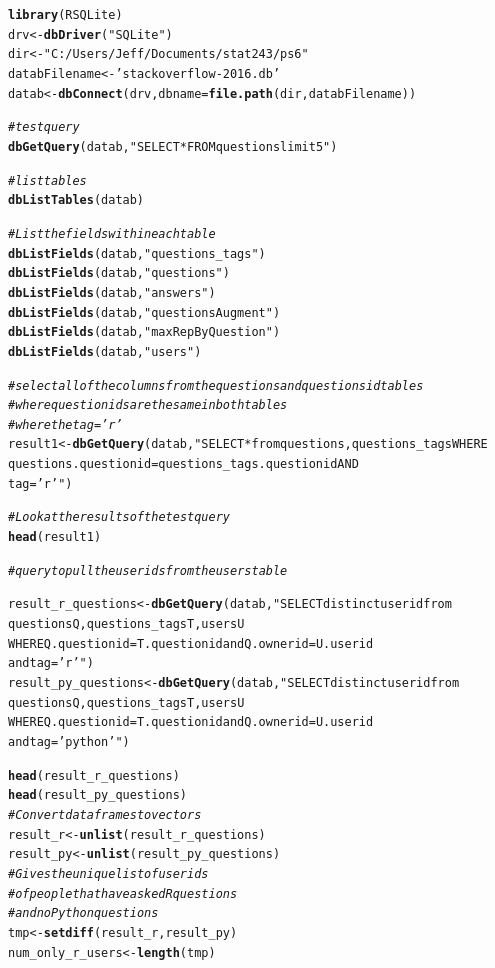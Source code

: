 \documentclass{article}\usepackage[]{graphicx}\usepackage[]{color}
\makeatletter
\newcommand{\hlstr}[1]{\textcolor[rgb]{0.192,0.494,0.8}{#1}}%
\newcommand{\hlcom}[1]{\textcolor[rgb]{0.678,0.584,0.686}{\textit{#1}}}%
\newcommand{\hlstd}[1]{\textcolor[rgb]{0.345,0.345,0.345}{#1}}%
\newcommand{\hlkwb}[1]{\textcolor[rgb]{0.69,0.353,0.396}{#1}}%
\newcommand{\hlkwc}[1]{\textcolor[rgb]{0.333,0.667,0.333}{#1}}%
\newcommand{\hlkwd}[1]{\textcolor[rgb]{0.737,0.353,0.396}{\textbf{#1}}}%
\newenvironment{kframe}{%
 \def\at@end@of@kframe{}%
 \ifinner\ifhmode%
  \def\at@end@of@kframe{\end{minipage}}%
  \begin{minipage}{\columnwidth}%
 \fi\fi%
 \def\FrameCommand##1{\hskip\@totalleftmargin \hskip-\fboxsep
 \colorbox{shadecolor}{##1}\hskip-\fboxsep
     \hskip-\linewidth \hskip-\@totalleftmargin \hskip\columnwidth}%
 \MakeFramed {\advance\hsize-\width
   \@totalleftmargin\z@ \linewidth\hsize
   \@setminipage}}%
 {\par\unskip\endMakeFramed%
 \at@end@of@kframe}
\newenvironment{knitrout}{}{} %
\makeatother
\begin{document}
\begin{knitrout}
\color{fgcolor}\begin{kframe}
\begin{alltt}
\hlkwd{library}\hlstd{(RSQLite)}
\hlstd{drv} \hlkwb{<-} \hlkwd{dbDriver}\hlstd{(}\hlstr{"SQLite"}\hlstd{)}
\hlstd{dir} \hlkwb{<-} \hlstr{"C:/Users/Jeff/Documents/stat243/ps6"}
\hlstd{databFilename} \hlkwb{<-} \hlstr{'stackoverflow-2016.db'}
\hlstd{datab} \hlkwb{<-} \hlkwd{dbConnect}\hlstd{(drv,} \hlkwc{dbname} \hlstd{=} \hlkwd{file.path}\hlstd{(dir, databFilename))}

\hlcom{# test query}
\hlkwd{dbGetQuery}\hlstd{(datab,} \hlstr{"SELECT * FROM questions limit 5"}\hlstd{)}

\hlcom{# list tables}
\hlkwd{dbListTables}\hlstd{(datab)}

\hlcom{# List the fields within each table}
\hlkwd{dbListFields}\hlstd{(datab,} \hlstr{"questions_tags"}\hlstd{)}
\hlkwd{dbListFields}\hlstd{(datab,} \hlstr{"questions"}\hlstd{)}
\hlkwd{dbListFields}\hlstd{(datab,} \hlstr{"answers"}\hlstd{)}
\hlkwd{dbListFields}\hlstd{(datab,} \hlstr{"questionsAugment"}\hlstd{)}
\hlkwd{dbListFields}\hlstd{(datab,} \hlstr{"maxRepByQuestion"}\hlstd{)}
\hlkwd{dbListFields}\hlstd{(datab,} \hlstr{"users"}\hlstd{)}

\hlcom{# select all of the columns from the questions and questions id tables}
\hlcom{# where questionids are the same in both tables}
\hlcom{# where the tag = 'r'}
\hlstd{result1} \hlkwb{<-} \hlkwd{dbGetQuery}\hlstd{(datab,} \hlstr{"SELECT * from questions, questions_tags WHERE
                      questions.questionid = questions_tags.questionid AND 
                      tag = 'r'"}\hlstd{)}

\hlcom{# Look at the results of the test query}
\hlkwd{head}\hlstd{(result1)}

\hlcom{# query to pull the user ids from the users table}

\hlstd{result_r_questions} \hlkwb{<-} \hlkwd{dbGetQuery}\hlstd{(datab,} \hlstr{"SELECT distinct userid from 
                      questions Q, questions_tags T, users U
                      WHERE Q.questionid = T.questionid and Q.ownerid = U.userid
                      and tag = 'r'"}\hlstd{)}
\hlstd{result_py_questions} \hlkwb{<-} \hlkwd{dbGetQuery}\hlstd{(datab,} \hlstr{"SELECT distinct userid from 
                      questions Q, questions_tags T, users U
                      WHERE Q.questionid = T.questionid and Q.ownerid = U.userid
                      and tag = 'python'"}\hlstd{)}

\hlkwd{head}\hlstd{(result_r_questions)}
\hlkwd{head}\hlstd{(result_py_questions)}
\hlcom{# Convert data frames to vectors}
\hlstd{result_r} \hlkwb{<-} \hlkwd{unlist}\hlstd{(result_r_questions)}
\hlstd{result_py} \hlkwb{<-} \hlkwd{unlist}\hlstd{(result_py_questions)}
\hlcom{# Gives the unique list of userids}
\hlcom{# of people that have asked R questions}
\hlcom{# and no Python questions }
\hlstd{tmp} \hlkwb{<-} \hlkwd{setdiff}\hlstd{(result_r, result_py)}
\hlstd{num_only_r_users} \hlkwb{<-} \hlkwd{length}\hlstd{(tmp)}
\end{alltt}
\end{kframe}
\end{knitrout}
\end{document}
